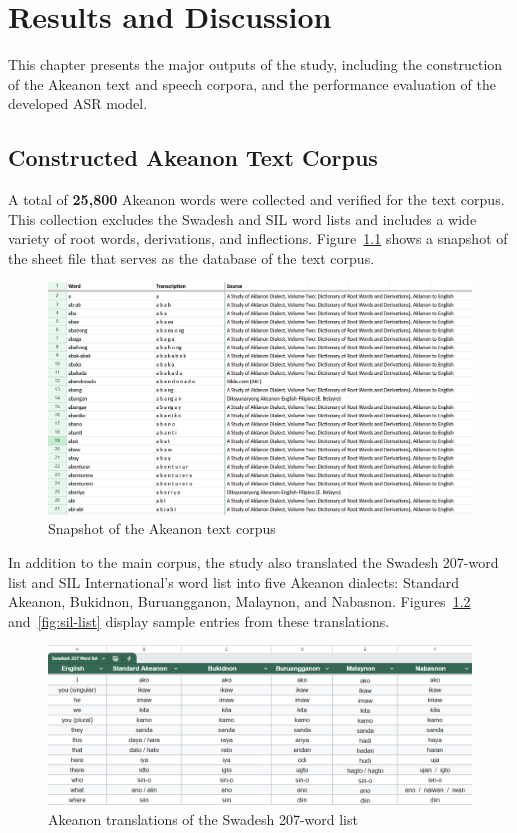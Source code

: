 \chapter{Results and Discussion}

This chapter presents the major outputs of the study, including the construction of the Akeanon text and speech corpora, and the performance evaluation of the developed ASR model.

\section{Constructed Akeanon Text Corpus}

A total of \textbf{25,800} Akeanon words were collected and verified for the text corpus. This collection excludes the Swadesh and SIL word lists and includes a wide variety of root words, derivations, and inflections. Figure~\ref{fig:text-corpus} shows a snapshot of the sheet file that serves as the database of the text corpus.

\begin{figure}[H]
    \centering
    \includegraphics[width=\textwidth]{./figures/text-corpus.png}
    \caption{Snapshot of the Akeanon text corpus}
    \label{fig:text-corpus}
\end{figure}

In addition to the main corpus, the study also translated the Swadesh 207-word list and SIL International's word list into five Akeanon dialects: Standard Akeanon, Bukidnon, Buruangganon, Malaynon, and Nabasnon. Figures~\ref{fig:swadesh-list} and~\ref{fig:sil-list} display sample entries from these translations.

\begin{figure}[H]
    \centering
    \includegraphics[width=\textwidth]{./figures/swadesh.png}
    \caption{Akeanon translations of the Swadesh 207-word list}
    \label{fig:swadesh-list}
\end{figure}

